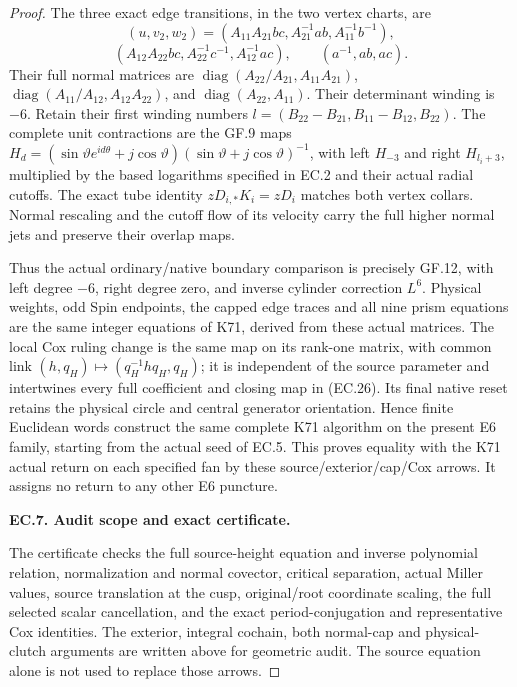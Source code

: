 \begin{proof}
The three exact edge transitions, in the two vertex charts, are
\[
 (u,v_2,w_2)=
 (A_{11}A_{21}bc,A_{21}^{-1}ab,A_{11}^{-1}b^{-1}),
\]
\[
 (A_{12}A_{22}bc,A_{22}^{-1}c^{-1},A_{12}^{-1}ac),
 \qquad(a^{-1},ab,ac).
 \tag{EC.27}
\]
Their full normal matrices are
\(\operatorname{diag}(A_{22}/A_{21},A_{11}A_{21})\),
\(\operatorname{diag}(A_{11}/A_{12},A_{12}A_{22})\), and
\(\operatorname{diag}(A_{22},A_{11})\). Their determinant winding
is \(-6\). Retain their first winding numbers
\(l=(B_{22}-B_{21},B_{11}-B_{12},B_{22})\).
The complete unit contractions are the GF.9 maps
\(H_d=(\sin\vartheta e^{id\theta}+j\cos\vartheta)
(\sin\vartheta+j\cos\vartheta)^{-1}\), with left \(H_{-3}\)
and right \(H_{l_i+3}\), multiplied by the based logarithms
specified in EC.2 and their actual radial cutoffs. The exact tube
identity \(zD_{i,*}K_i=zD_i\) matches both vertex collars. Normal
rescaling and the cutoff flow of its velocity carry the full
higher normal jets and preserve their overlap maps.

Thus the actual ordinary/native boundary comparison is precisely
GF.12, with left degree \(-6\), right degree zero, and inverse
cylinder correction \(L^6\). Physical weights, odd Spin endpoints,
the capped edge traces and all nine prism equations are the same
integer equations of K71, derived from these actual matrices.
The local Cox ruling change is the same map on its rank-one matrix,
with common link \((h,q_H)\mapsto(q_H^{-1}hq_H,q_H)\); it is
independent of the source parameter and intertwines every full
coefficient and closing map in (EC.26). Its final native reset
retains the physical circle and central generator orientation.
Hence finite Euclidean words construct the same complete K71
algorithm on the present E6 family, starting from the actual seed
of EC.5. This proves equality with the K71 actual return on each
specified fan by these source/exterior/cap/Cox arrows. It assigns
no return to any other E6 puncture.

\par\medskip\noindent\textbf{EC.7. Audit scope and exact certificate.}\par\nopagebreak[4]

The certificate  checks
the full source-height equation and inverse polynomial relation,
normalization and normal covector, critical separation, actual
Miller values, source translation at the cusp, original/root
coordinate scaling, the full selected scalar cancellation, and
the exact period-conjugation and representative Cox identities.
The exterior, integral cochain, both normal-cap and physical-clutch
arguments are written above for geometric audit. The source
equation alone is not used to replace those arrows.
\end{proof}
